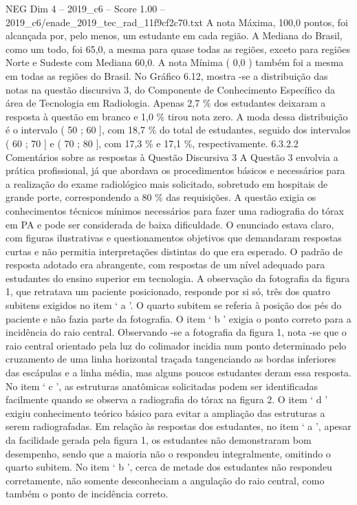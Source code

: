 \begin{textsample}{NEG Dim 4 – 2019\_c6 – Score 1.00 – 2019\_c6/enade\_2019\_tec\_rad\_11f9cf2c70.txt}
A nota Máxima, 100,0 pontos, foi alcançada por, pelo menos, um estudante em cada região.
A Mediana do Brasil, como um todo, foi 65,0, a mesma para quase todas as regiões, exceto para regiões Norte e Sudeste com Mediana 60,0.
A nota Mínima ( 0,0 ) também foi a mesma em todas as regiões do Brasil.
No Gráfico 6.12, mostra -se a distribuição das notas na questão discursiva 3, do Componente de Conhecimento Específico da área de Tecnologia em Radiologia.
Apenas 2,7 \% dos estudantes deixaram a resposta à questão em branco e 1,0 \% tirou nota zero.
A moda dessa distribuição é o intervalo ( 50 ; 60 ], com 18,7 \% do total de estudantes, seguido dos intervalos ( 60 ; 70 ] e ( 70 ; 80 ], com 17,3 \% e 17,1 \%, respectivamente. 6.3.2.2 Comentários sobre as respostas à Questão Discursiva 3 A Questão 3 envolvia a prática profissional, já que abordava os procedimentos básicos e necessários para a realização do exame radiológico mais solicitado, sobretudo em hospitais de grande porte, correspondendo a 80 \% das requisições.
A questão exigia os conhecimentos técnicos mínimos necessários para fazer uma radiografia do tórax em PA e pode ser considerada de baixa dificuldade.
O enunciado estava claro, com figuras ilustrativas e questionamentos objetivos que demandaram respostas curtas e não permitia interpretações distintas do que era esperado.
O padrão de resposta adotado era abrangente, com respostas de um nível adequado para estudantes do ensino superior em tecnologia.
A observação da fotografia da figura 1, que retratava um paciente posicionado, responde por si só, três dos quatro subitens exigidos no item ‘ a ’.
O quarto subitem se referia à posição dos pés do paciente e não fazia parte da fotografia.
O item ‘ b ’ exigia o ponto correto para a incidência do raio central.
Observando -se a fotografia da figura 1, nota -se que o raio central orientado pela luz do colimador incidia num ponto determinado pelo cruzamento de uma linha horizontal traçada tangenciando as bordas inferiores das escápulas e a linha média, mas alguns poucos estudantes deram essa resposta.
No item ‘ c ’, as estruturas anatômicas solicitadas podem ser identificadas facilmente quando se observa a radiografia do tórax na figura 2.
O item ‘ d ’ exigiu conhecimento teórico básico para evitar a ampliação das estruturas a serem radiografadas.
Em relação às respostas dos estudantes, no item ‘ a ’, apesar da facilidade gerada pela figura 1, os estudantes não demonstraram bom desempenho, sendo que a maioria não o respondeu integralmente, omitindo o quarto subitem.
No item ‘ b ’, cerca de metade dos estudantes não respondeu corretamente, não somente desconheciam a angulação do raio central, como também o ponto de incidência correto.

\end{textsample}
